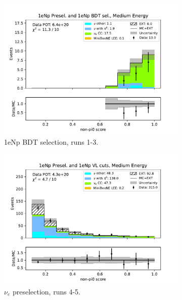 \begin{figure}[H]
    \begin{subfigure}{0.33\linewidth}
        \includegraphics[width=\linewidth]{technote/Sidebands/Figures/NearSideband/near_sideband_nonpi0_score_run123_NP_NPBDT_MEDIUM_ENERGY.pdf}
        \caption{1eNp BDT selection, runs 1-3.}
    \end{subfigure}
    \begin{subfigure}{0.33\linewidth}
        \includegraphics[width=\linewidth]{technote/Sidebands/Figures/NearSideband/near_sideband_nonpi0_score_run4b4c4d5_NP_NP_MEDIUM_ENERGY.pdf}
        \caption{$\nu_e$ preselection, runs 4-5.}
    \end{subfigure}%
    \begin{subfigure}{0.33\linewidth}

\end{subfigure}
\end{figure}
